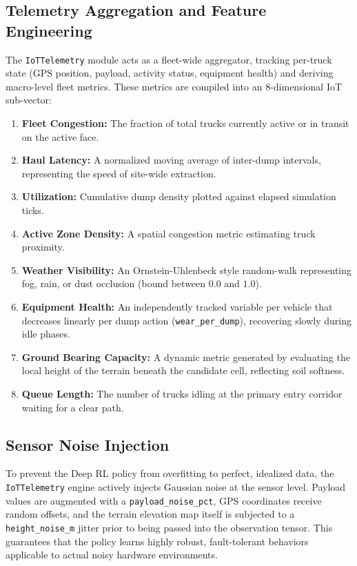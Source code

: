 \documentclass[conference]{IEEEtran}
\begin{document}
\subsection{Telemetry Aggregation and Feature Engineering}
The \texttt{IoTTelemetry} module acts as a fleet-wide aggregator, tracking per-truck state (GPS position, payload, activity status, equipment health) and deriving macro-level fleet metrics. These metrics are compiled into an 8-dimensional IoT sub-vector:
\begin{enumerate}
    \item \textbf{Fleet Congestion:} The fraction of total trucks currently active or in transit on the active face.
    \item \textbf{Haul Latency:} A normalized moving average of inter-dump intervals, representing the speed of site-wide extraction.
    \item \textbf{Utilization:} Cumulative dump density plotted against elapsed simulation ticks.
    \item \textbf{Active Zone Density:} A spatial congestion metric estimating truck proximity.
    \item \textbf{Weather Visibility:} An Ornstein-Uhlenbeck style random-walk representing fog, rain, or dust occlusion (bound between $0.0$ and $1.0$).
    \item \textbf{Equipment Health:} An independently tracked variable per vehicle that decreases linearly per dump action (\texttt{wear\_per\_dump}), recovering slowly during idle phases.
    \item \textbf{Ground Bearing Capacity:} A dynamic metric generated by evaluating the local height of the terrain beneath the candidate cell, reflecting soil softness.
    \item \textbf{Queue Length:} The number of trucks idling at the primary entry corridor waiting for a clear path.
\end{enumerate}

\subsection{Sensor Noise Injection}
To prevent the Deep RL policy from overfitting to perfect, idealized data, the \texttt{IoTTelemetry} engine actively injects Gaussian noise at the sensor level. Payload values are augmented with a \texttt{payload\_noise\_pct}, GPS coordinates receive random offsets, and the terrain elevation map itself is subjected to a \texttt{height\_noise\_m} jitter prior to being passed into the observation tensor. This guarantees that the policy learns highly robust, fault-tolerant behaviors applicable to actual noisy hardware environments.
\end{document}
